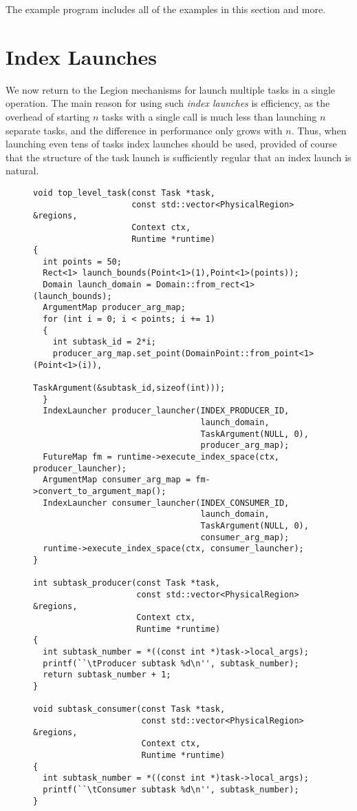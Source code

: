 The example program  includes all of the examples in this section and more.

\section{Index Launches}
\label{sec:indexlaunch}

We now return to the Legion mechanisms for launch multiple tasks in a
single operation.  The main reason for using such {\em index launches}
is efficiency, as the overhead of starting $n$ tasks with a single
call is much less than launching $n$ separate tasks, and the
difference in performance only grows with $n$.  Thus, when launching
even tens of tasks index launches should be used, provided of course
that the structure of the task launch is sufficiently regular that an
index launch is natural.

\begin{figure}
{\small
\begin{lstlisting}
void top_level_task(const Task *task,
                    const std::vector<PhysicalRegion> &regions,
                    Context ctx,
                    Runtime *runtime)
{
  int points = 50;
  Rect<1> launch_bounds(Point<1>(1),Point<1>(points));
  Domain launch_domain = Domain::from_rect<1>(launch_bounds);
  ArgumentMap producer_arg_map;
  for (int i = 0; i < points; i += 1)
  {
    int subtask_id = 2*i;
    producer_arg_map.set_point(DomainPoint::from_point<1>(Point<1>(i)),
                               TaskArgument(&subtask_id,sizeof(int)));
  }
  IndexLauncher producer_launcher(INDEX_PRODUCER_ID,
                                  launch_domain,
                                  TaskArgument(NULL, 0),
                                  producer_arg_map);
  FutureMap fm = runtime->execute_index_space(ctx, producer_launcher);
  ArgumentMap consumer_arg_map = fm->convert_to_argument_map();
  IndexLauncher consumer_launcher(INDEX_CONSUMER_ID,
                                  launch_domain,
                                  TaskArgument(NULL, 0),
                                  consumer_arg_map);
  runtime->execute_index_space(ctx, consumer_launcher);
}

int subtask_producer(const Task *task,
                     const std::vector<PhysicalRegion> &regions,
                     Context ctx,
                     Runtime *runtime)
{
  int subtask_number = *((const int *)task->local_args);
  printf(``\tProducer subtask %d\n'', subtask_number);
  return subtask_number + 1;
}

void subtask_consumer(const Task *task,
                      const std::vector<PhysicalRegion> &regions,
                      Context ctx,
                      Runtime *runtime)
{
  int subtask_number = *((const int *)task->local_args);
  printf(``\tConsumer subtask %d\n'', subtask_number);
}
\end{lstlisting}
}
\caption{}
\label{fig:indexlaunch}
\end{figure}


